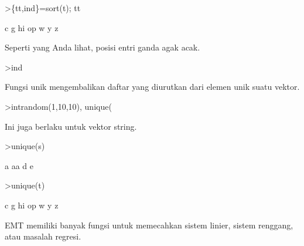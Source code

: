 \documentclass[a4paper,10pt]{article}
\begin{document}
\begin{eulernotebook}
\begin{eulercomment}
\begin{eulercomment}
\begin{eulercomment}
\begin{eulercomment}
\begin{eulercomment}
\begin{eulercomment}
\begin{eulerprompt}
>\{tt,ind\}=sort(t); tt
\end{eulerprompt}
\begin{euleroutput}
  c
  g
  hi
  op
  w
  y
  z
\end{euleroutput}
\begin{eulercomment}
Seperti yang Anda lihat, posisi entri ganda agak acak.
\end{eulercomment}
\begin{eulerprompt}
>ind
\end{eulerprompt}
\begin{euleroutput}
  [4,  1,  5,  2,  6,  3]
\end{euleroutput}
\begin{eulercomment}
Fungsi unik mengembalikan daftar yang diurutkan dari elemen unik suatu
vektor.
\end{eulercomment}
\begin{eulerprompt}
>intrandom(1,10,10), unique(%
\end{eulerprompt}
\begin{euleroutput}
  [4,  4,  9,  2,  6,  5,  10,  6,  5,  1]
  [1,  2,  4,  5,  6,  9,  10]
\end{euleroutput}
\begin{eulercomment}
Ini juga berlaku untuk vektor string.
\end{eulercomment}
\begin{eulerprompt}
>unique(s)
\end{eulerprompt}
\begin{euleroutput}
  a
  aa
  d
  e
\end{euleroutput}
\begin{eulerprompt}
>unique(t)
\end{eulerprompt}
\begin{euleroutput}
  c
  g
  hi
  op
  w
  y
  z
\end{euleroutput}
\begin{eulercomment}
EMT memiliki banyak fungsi untuk memecahkan sistem linier, sistem
renggang, atau masalah regresi.


\end{eulercomment}
\end{eulercomment}
\end{eulercomment}
\end{eulercomment}
\end{eulercomment}
\end{eulercomment}
\end{eulercomment}
\end{eulernotebook}
\end{document}
